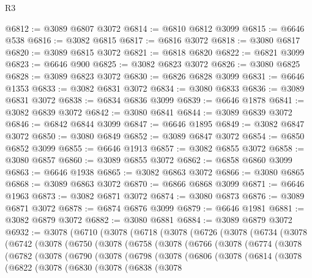 \begin{lexlean}{R3}
\begin{coremodule}
@6812 := @3089 @6807 @3072
@6814 := @6810 @6812 @3099
@6815 := @6646 @538
@6816 := @3082 @6815
@6817 := @6816 @3072
@6818 := @3080 @6817
@6820 := @3089 @6815 @3072
@6821 := @6818 @6820
@6822 := @6821 @3099
@6823 := @6646 @900
@6825 := @3082 @6823 @3072
@6826 := @3080 @6825
@6828 := @3089 @6823 @3072
@6830 := @6826 @6828 @3099
@6831 := @6646 @1353
@6833 := @3082 @6831 @3072
@6834 := @3080 @6833
@6836 := @3089 @6831 @3072
@6838 := @6834 @6836 @3099
@6839 := @6646 @1878
@6841 := @3082 @6839 @3072
@6842 := @3080 @6841
@6844 := @3089 @6839 @3072
@6846 := @6842 @6844 @3099
@6847 := @6646 @1895
@6849 := @3082 @6847 @3072
@6850 := @3080 @6849
@6852 := @3089 @6847 @3072
@6854 := @6850 @6852 @3099
@6855 := @6646 @1913
@6857 := @3082 @6855 @3072
@6858 := @3080 @6857
@6860 := @3089 @6855 @3072
@6862 := @6858 @6860 @3099
@6863 := @6646 @1938
@6865 := @3082 @6863 @3072
@6866 := @3080 @6865
@6868 := @3089 @6863 @3072
@6870 := @6866 @6868 @3099
@6871 := @6646 @1963
@6873 := @3082 @6871 @3072
@6874 := @3080 @6873
@6876 := @3089 @6871 @3072
@6878 := @6874 @6876 @3099
@6879 := @6646 @1981
@6881 := @3082 @6879 @3072
@6882 := @3080 @6881
@6884 := @3089 @6879 @3072
@6932 := @3078
    (@6710
      (@3078
        (@6718
          (@3078
            (@6726
              (@3078
                (@6734
                  (@3078
                    (@6742
                      (@3078
                        (@6750
                          (@3078
                            (@6758
                              (@3078
                                (@6766
                                  (@3078
                                    (@6774
                                      (@3078
                                        (@6782
                                          (@3078
                                            (@6790
                                              (@3078
                                                (@6798
                                                  (@3078
                                                    (@6806
                                                      (@3078
                                                        (@6814
                                                          (@3078
                                                            (@6822
                                                              (@3078
                                                                (@6830
                                                                  (@3078
                                                                    (@6838
                                                                      (@3078

\end{coremodule}
\end{lexlean}

